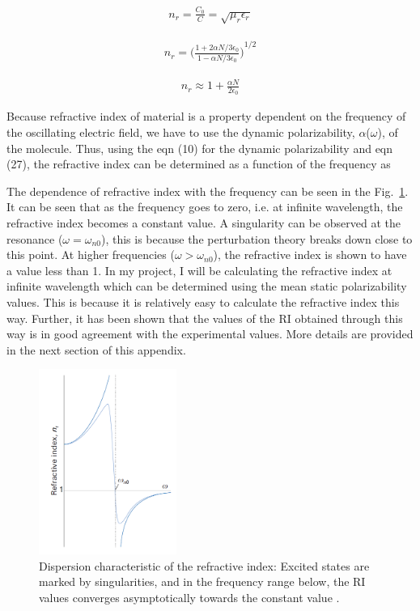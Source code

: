 \begin{align}
n_r = \frac{C_0}{C} = \sqrt{\mu_r\epsilon_r}
\end{align}

\begin{align}
n_r = {\bigg(\frac{1 + 2\alpha N / 3 \epsilon_0}{1 - \alpha N / 3 \epsilon_0}\bigg)}^{1/2}
\end{align}

\begin{align}
n_r \approx 1 + \frac{\alpha N}{2 \epsilon_0}
\end{align}

Because refractive index of material is a property dependent on the frequency of the oscillating electric field, we have to use the dynamic polarizability, $\alpha$($\omega$), of the molecule. Thus, using the eqn (10) for the dynamic polarizability and eqn (27), the refractive index can be determined as a function of the frequency as


The dependence of refractive index with the frequency can be seen in the Fig.\ \ref{fig:RI_freq}. It can be seen that as the frequency goes to zero, i.e. at infinite wavelength, the refractive index becomes a constant value. A singularity can be observed at the resonance ($\omega = \omega_{n0}$), this is because the perturbation theory breaks down close to this point. At higher frequencies ($\omega>\omega_{n0}$), the refractive index is shown to have a value less than 1. In my project, I will be calculating the refractive index at infinite wavelength which can be determined using the mean static polarizability values. This is because it is relatively easy to calculate the refractive index this way. Further, it has been shown that the values of the RI obtained through this way is in good agreement with the experimental values. More details are provided in the next section of this appendix. 


\begin{figure}[htbp] 
	\centering
	\includegraphics[width=0.4\textwidth]{Appendix-A/Figures/RI_vs_omega.png}
	\caption{Dispersion characteristic of the refractive index: Excited states are marked by singularities, and in the frequency range below, the RI values converges asymptotically towards the constant value \cite{Atkins2011}.} 
	\label{fig:RI_freq} 
\end{figure}  


